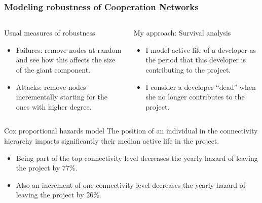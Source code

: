\documentclass[ignorenonframetext,red,8pt,notes=hide]{beamer}
\begin{document}
\begin{frame}
\frametitle{Modeling robustness of Cooperation Networks}

\begin{columns}[c]
\begin{column}{0.5\textwidth}
\begin{block}{Usual measures of robustness}
\begin{itemize}
\item Failures: remove nodes at random and see how this affects the size of the giant component.  
\item Attacks: remove nodes incrementally starting for the ones with higher degree.
\end{itemize}
\end{block}
\end{column}

\pause

\begin{column}{0.5\textwidth}

\begin{block}{My approach: Survival analysis}
\begin{itemize}
\item I model active life of a developer as the period that this developer is contributing to the project.
\item I consider a developer ``dead'' when she no longer contributes to the project.
\end{itemize}
\end{block}
\end{column}
\end{columns}

\pause

\begin{block}{Cox proportional hazards model}
The position of an individual in the connectivity hierarchy impacts significantly their median active life in the project.

\begin{itemize}
\item Being part of the top connectivity level decreases the yearly hazard of leaving the project by 77\%.
\item Also an increment of one connectivity level decreases the yearly hazard of leaving the project by 26\%.
\end{itemize}
\end{block}


\end{frame}
\end{document}
